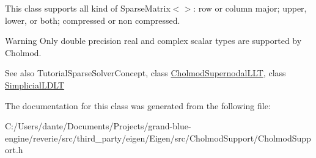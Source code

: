 This class supports all kind of Sparse\+Matrix$<$$>$\+: row or column major; upper, lower, or both; compressed or non compressed.

\begin{DoxyWarning}{Warning}
Only double precision real and complex scalar types are supported by Cholmod.
\end{DoxyWarning}
\begin{DoxySeeAlso}{See also}
Tutorial\+Sparse\+Solver\+Concept, class \mbox{\hyperlink{class_eigen_1_1_cholmod_supernodal_l_l_t}{Cholmod\+Supernodal\+L\+LT}}, class \mbox{\hyperlink{class_eigen_1_1_simplicial_l_d_l_t}{Simplicial\+L\+D\+LT}} 
\end{DoxySeeAlso}


The documentation for this class was generated from the following file\+:\begin{DoxyCompactItemize}
\item 
C\+:/\+Users/dante/\+Documents/\+Projects/grand-\/blue-\/engine/reverie/src/third\+\_\+party/eigen/\+Eigen/src/\+Cholmod\+Support/Cholmod\+Support.\+h\end{DoxyCompactItemize}
